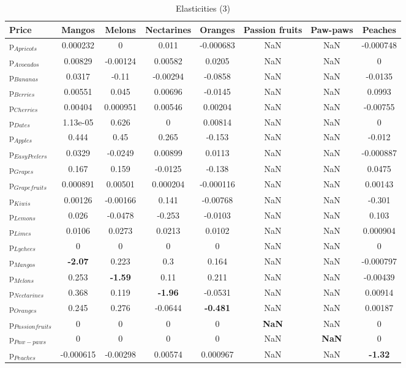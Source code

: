 \documentclass[11pt]{article}
\begin{document}
\begin{table}[h]
\caption{Elasticities (3)}
\label{table:elasticities 3}
\begin{center}
\begin{tabular}{lccccccc} \hline \hline
Price &Mangos &Melons &Nectarines &Oranges &Passion fruits &Paw-paws &Peaches \\ \hline
p$_{Apricots}$ &0.000232 &0 &0.011 &-0.000683 &NaN &NaN &-0.000748 \\
p$_{Avocados}$ &0.00829 &-0.00124 &0.00582 &0.0205 &NaN &NaN &0 \\
p$_{Bananas}$ &0.0317 &-0.11 &-0.00294 &-0.0858 &NaN &NaN &-0.0135 \\
p$_{Berries}$ &0.00551 &0.045 &0.00696 &-0.0145 &NaN &NaN &0.0993 \\
p$_{Cherries}$ &0.00404 &0.000951 &0.00546 &0.00204 &NaN &NaN &-0.00755 \\
p$_{Dates}$ &1.13e-05 &0.626 &0 &0.00814 &NaN &NaN &0 \\
p$_{Apples}$ &0.444 &0.45 &0.265 &-0.153 &NaN &NaN &-0.012 \\
p$_{Easy Peelers}$ &0.0329 &-0.0249 &0.00899 &0.0113 &NaN &NaN &-0.000887 \\
p$_{Grapes}$ &0.167 &0.159 &-0.0125 &-0.138 &NaN &NaN &0.0475 \\
p$_{Grapefruits}$ &0.000891 &0.00501 &0.000204 &-0.000116 &NaN &NaN &0.00143 \\
p$_{Kiwis}$ &0.00126 &-0.00166 &0.141 &-0.00768 &NaN &NaN &-0.301 \\
p$_{Lemons}$ &0.026 &-0.0478 &-0.253 &-0.0103 &NaN &NaN &0.103 \\
p$_{Limes}$ &0.0106 &0.0273 &0.0213 &0.0102 &NaN &NaN &0.000904 \\
p$_{Lychees}$ &0 &0 &0 &0 &NaN &NaN &0 \\
p$_{Mangos}$ &\textbf{-2.07} &0.223 &0.3 &0.164 &NaN &NaN &-0.000797 \\
p$_{Melons}$ &0.253 &\textbf{-1.59} &0.11 &0.211 &NaN &NaN &-0.00439 \\
p$_{Nectarines}$ &0.368 &0.119 &\textbf{-1.96} &-0.0531 &NaN &NaN &0.00914 \\
p$_{Oranges}$ &0.245 &0.276 &-0.0644 &\textbf{-0.481} &NaN &NaN &0.00187 \\
p$_{Passion fruits}$ &0 &0 &0 &0 &\textbf{NaN} &NaN &0 \\
p$_{Paw-paws}$ &0 &0 &0 &0 &NaN &\textbf{NaN} &0 \\
p$_{Peaches}$ &-0.000615 &-0.00298 &0.00574 &0.000967 &NaN &NaN &\textbf{-1.32} \\

\end{tabular}
\end{center}
\end{table}
\end{document}
